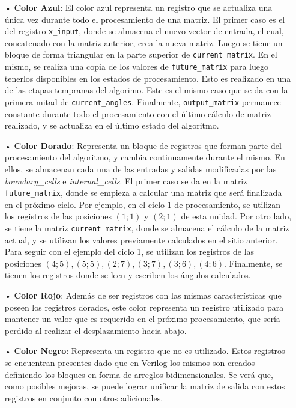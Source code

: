 \begin{itemize}
	\item[•] \textbf{Color Azul}: El color azul representa un registro que se actualiza una única vez durante todo el procesamiento de una matriz. El primer caso es el del registro \verb;x_input;, donde se almacena el nuevo vector de entrada, el cual, concatenado con la matriz anterior, crea la nueva matriz. Luego se tiene un bloque de forma triangular en la parte superior de \verb;current_matrix;. En el mismo, se realiza una copia de los valores de \verb;future_matrix; para luego tenerlos disponibles en los estados de procesamiento. Esto es realizado en una de las etapas tempranas del algorimo. Este es el mismo caso que se da con la primera mitad de \verb;current_angles;. Finalmente, \verb;output_matrix; permanece constante durante todo el procesamiento con el último cálculo de matriz realizado, y se actualiza en el último estado del algoritmo.
	
	\item[•] \textbf{Color Dorado}: Representa un bloque de registros que forman parte del procesamiento del algoritmo, y cambia continuamente durante el mismo. En ellos, se almacenan cada una de las entradas y salidas modificadas por las \textit{boundary\_cells} e \textit{internal\_cells}. El primer caso se da en la matriz \verb;future_matrix;, donde se empieza a calcular una matriz que será finalizada en el próximo ciclo. Por ejemplo, en el ciclo 1 de procesamiento, se utilizan los registros de las posiciones $(1;1)$ y $(2;1)$ de esta unidad. Por otro lado, se tiene la matriz \verb;current_matrix;, donde se almacena el cálculo de la matriz actual, y se utilizan los valores previamente calculados en el sitio anterior. Para seguir con el ejemplo del ciclo 1, se utilizan los registros de las posiciones $(4;5), (5;5), (2;7), (3;7), (3;6), (4;6)$. Finalmente, se tienen los registros donde se leen y escriben los ángulos calculados.
	
	\item[•] \textbf{Color Rojo}: Además de ser registros con las mismas características que poseen los registros dorados, este color representa un registro utilizado para mantener un valor que es requerido en el próximo procesamiento, que sería perdido al realizar el desplazamiento hacia abajo.
	
	\item[•] \textbf{Color Negro}: Representa un registro que no es utilizado. Estos registros se encuentran presentes dado que en Verilog los mismos son creados definiendo los bloques en forma de arreglos bidimensionales. Se verá que, como posibles mejoras, se puede lograr unificar la matriz de salida con estos registros en conjunto con otros adicionales.
\end{itemize}

